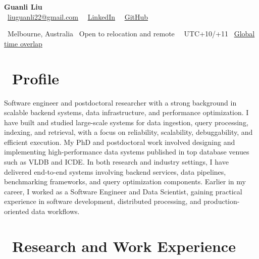 \documentclass{resume}
\begin{document}

{\LARGE \textbf{Guanli Liu}}\\[-0.2em]
\faEnvelope\ \href{mailto:liuguanli22@gmail.com}{liuguanli22@gmail.com} 
\textperiodcentered\ 
\faLinkedin\ \href{https://www.linkedin.com/in/guanli-liu-11353058/}{LinkedIn} \textperiodcentered\ 
\faGithub\ \href{https://github.com/Liuguanli}{GitHub}

\faMapMarker\ Melbourne, Australia \textperiodcentered\ Open to relocation and remote \textperiodcentered\ 
\faClockO\  UTC+10/+11 \textperiodcentered\ 
\href{https://www.worldtimebuddy.com/?lid=5808079,5128581,5809844,1816670,2158177&h=2158177&hf=1}{Global time overlap \faExternalLink}
\vspace{0.4em}



\section{\faUser\ \textbf{Profile}}
Software engineer and postdoctoral researcher with a strong background in scalable backend systems, data infrastructure, and performance optimization. I have built and studied large-scale systems for data ingestion, query processing, indexing, and retrieval, with a focus on reliability, scalability, debuggability, and efficient execution. My PhD and postdoctoral work involved designing and implementing high-performance data systems published in top database venues such as VLDB and ICDE. In both research and industry settings, I have delivered end-to-end systems involving backend services, data pipelines, benchmarking frameworks, and query optimization components. Earlier in my career, I worked as a Software Engineer and Data Scientist, gaining practical experience in software development, distributed processing, and production-oriented data workflows.



\section{\faUsers\ \textbf{Research and Work Experience}}
\end{document}
